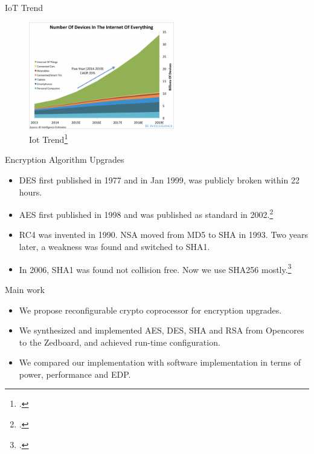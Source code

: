 \documentclass[t]{beamer}
\begin{document}
\begin{frame}{IoT Trend}
	\begin{figure}
        \includegraphics[width=2.5in]{img/iot_trend.png}
		\caption{Iot Trend\footcite{http://www.ironpaper.com/webintel/articles/internet-things-market-statistics-2015}}
		\label{fig:Iot_trend}
	\end{figure}
\end{frame}

\begin{frame}{Encryption Algorithm Upgrades}
	\begin{itemize}
		\item DES first published in 1977 and in Jan 1999, was publicly broken within 22 hours.
		\item AES first published in 1998 and was published as standard in 2002.\footcite{http://web.townsendsecurity.com/bid/72450/What-are-the-Differences-Between-DES-and-AES-Encryption}
		\item RC4 was invented in 1990. NSA moved from MD5 to SHA in 1993. Two years later, a weakness was found and switched to SHA1.
		\item In 2006, SHA1 was found not collision free. Now we use SHA256 mostly.\footcite{https://support.servertastic.com/deprecation-of-sha1-and-moving-to-sha2}
	\end{itemize}
\end{frame}

\begin{frame}{Main work}
	\begin{itemize}
		\item We propose reconfigurable crypto coprocessor for encryption upgrades.
		\item We synthesized and implemented AES, DES, SHA and RSA from Opencores to the Zedboard, and achieved run-time configuration.
		\item We compared our implementation with software implementation in terms of power, performance and EDP.
	\end{itemize}
\end{frame}
\end{document}
